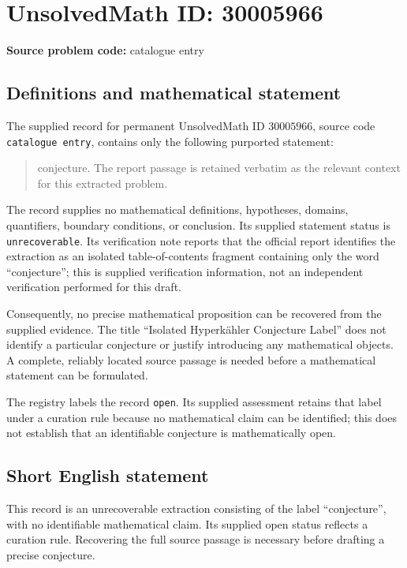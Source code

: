 \documentclass[11pt]{article}
\begin{document}
\section*{UnsolvedMath ID: 30005966}
\textbf{Source problem code:} catalogue entry
\subsection{Definitions and mathematical statement}
The supplied record for permanent UnsolvedMath ID \(30005966\), source code \texttt{catalogue entry}, contains only the following purported statement:
\begin{quote}
conjecture. The report passage is retained verbatim as the relevant context for this extracted problem.
\end{quote}
The record supplies no mathematical definitions, hypotheses, domains, quantifiers, boundary conditions, or conclusion. Its supplied statement status is \texttt{unrecoverable}. Its verification note reports that the official report identifies the extraction as an isolated table-of-contents fragment containing only the word ``conjecture''; this is supplied verification information, not an independent verification performed for this draft.

Consequently, no precise mathematical proposition can be recovered from the supplied evidence. The title ``Isolated Hyperkähler Conjecture Label'' does not identify a particular conjecture or justify introducing any mathematical objects. A complete, reliably located source passage is needed before a mathematical statement can be formulated.

The registry labels the record \texttt{open}. Its supplied assessment retains that label under a curation rule because no mathematical claim can be identified; this does not establish that an identifiable conjecture is mathematically open.
\subsection{Short English statement}
This record is an unrecoverable extraction consisting of the label ``conjecture'', with no identifiable mathematical claim. Its supplied open status reflects a curation rule. Recovering the full source passage is necessary before drafting a precise conjecture.
\end{document}
